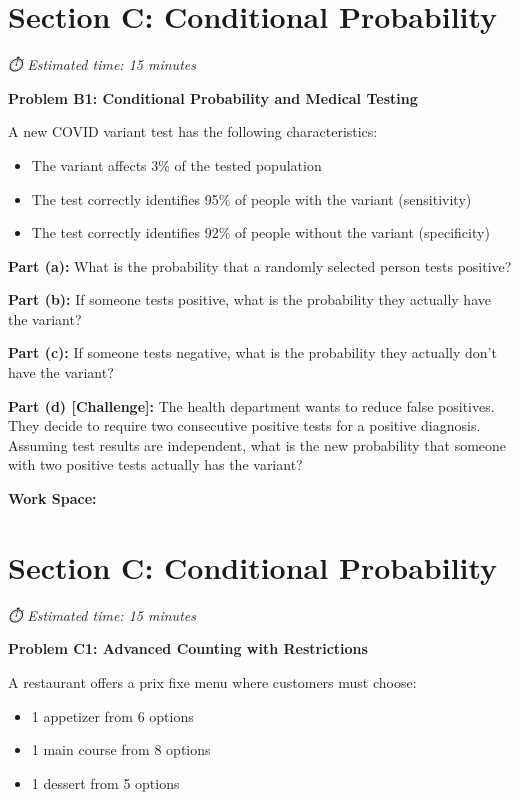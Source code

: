 \documentclass[
  11pt,
]{article}
\begin{document}
\section{Section C: Conditional
Probability}\label{section-c-conditional-probability}

\emph{⏱️ Estimated time: 15 minutes}

\textbf{Problem B1: Conditional Probability and Medical Testing}

A new COVID variant test has the following characteristics:

\begin{itemize}
\item
  The variant affects 3\% of the tested population
\item
  The test correctly identifies 95\% of people with the variant
  (sensitivity)
\item
  The test correctly identifies 92\% of people without the variant
  (specificity)
\end{itemize}

\textbf{Part (a):} What is the probability that a randomly selected
person tests positive?

\textbf{Part (b):} If someone tests positive, what is the probability
they actually have the variant?

\textbf{Part (c):} If someone tests negative, what is the probability
they actually don't have the variant?

\textbf{Part (d) {[}Challenge{]}:} The health department wants to reduce
false positives. They decide to require two consecutive positive tests
for a positive diagnosis. Assuming test results are independent, what is
the new probability that someone with two positive tests actually has
the variant?

\textbf{Work Space:}

\section{Section C: Conditional
Probability}\label{section-c-conditional-probability-1}

\emph{⏱️ Estimated time: 15 minutes}

\textbf{Problem C1: Advanced Counting with Restrictions}

A restaurant offers a prix fixe menu where customers must choose:

\begin{itemize}
\item
  1 appetizer from 6 options
\item
  1 main course from 8 options
\item
  1 dessert from 5 options
\end{itemize}
\end{document}
